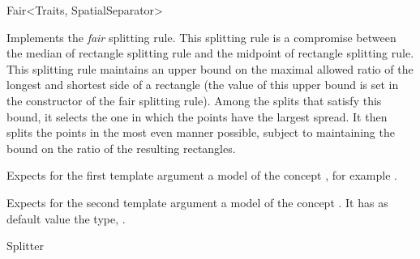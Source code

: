 

\begin{ccRefFunctionObjectClass}{Fair<Traits, SpatialSeparator>}  %


\ccDefinition
Implements the {\em fair} splitting rule.  
This splitting rule is a compromise between the median of rectangle
splitting rule and the midpoint of rectangle splitting rule. This
splitting rule maintains an upper bound on the maximal allowed ratio
of the longest and shortest side of a rectangle (the value of this
upper bound is set in the constructor of the fair splitting
rule). Among the splits that satisfy this bound, it selects the one in
which the points have the largest spread.  It then splits the points
in the most even manner possible, subject to maintaining the bound on
the ratio of the resulting rectangles.


\ccParameters

Expects for the first template argument a model of
the concept , 
for example . 

Expects for the second template argument a model of the concept . 
It has as default value the type, .



\ccIsModel

Splitter

\ccTypes


\ccCreation
{}  %


\ccSeeAlso

\\

\end{ccRefFunctionObjectClass}


